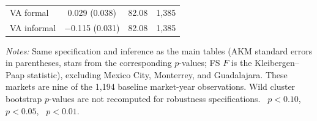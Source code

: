 \begin{threeparttable}
\begin{tabular}{lccr}
        VA formal       & 0.029 (0.038) & 82.08 & 1{,}385 \\
        VA informal     & $-$0.115\sym{***} (0.031) & 82.08 & 1{,}385 \\
        \bottomrule
    \end{tabular}
    \begin{tablenotes}[flushleft]
        \footnotesize
        \item \textit{Notes:} Same specification and inference as the main tables (AKM standard errors in parentheses, stars from the corresponding $p$-values; FS $F$ is the Kleibergen--Paap statistic), excluding Mexico City, Monterrey, and Guadalajara. These markets are nine of the 1,194 baseline market-year observations. Wild cluster bootstrap $p$-values are not recomputed for robustness specifications. \sym{*}~$p<0.10$, \sym{**}~$p<0.05$, \sym{***}~$p<0.01$. %
    \end{tablenotes}
\end{threeparttable}